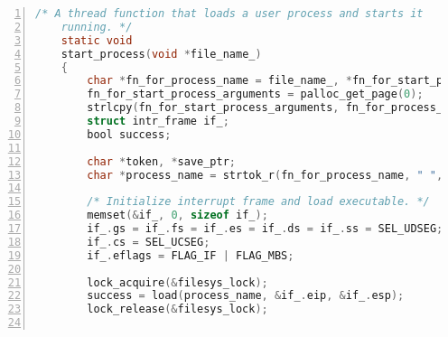 \documentclass{article}
\begin{document}
	
	\begin{lstlisting}[xleftmargin = 4em,xrightmargin = 4em, aboveskip = 1em, numbers = left, language = C,title=修改后的src/userprog/process.c - start\_process]
    /* A thread function that loads a user process and starts it
    running. */
    static void
    start_process(void *file_name_)
    {
    	char *fn_for_process_name = file_name_, *fn_for_start_process_arguments;
    	fn_for_start_process_arguments = palloc_get_page(0);
    	strlcpy(fn_for_start_process_arguments, fn_for_process_name, PGSIZE);
    	struct intr_frame if_;
    	bool success;
    	
    	char *token, *save_ptr;
    	char *process_name = strtok_r(fn_for_process_name, " ", &save_ptr);
    	
    	/* Initialize interrupt frame and load executable. */
    	memset(&if_, 0, sizeof if_);
    	if_.gs = if_.fs = if_.es = if_.ds = if_.ss = SEL_UDSEG;
    	if_.cs = SEL_UCSEG;
    	if_.eflags = FLAG_IF | FLAG_MBS;
    	
    	lock_acquire(&filesys_lock);
    	success = load(process_name, &if_.eip, &if_.esp);
    	lock_release(&filesys_lock);
    	

\end{lstlisting}
\end{document}
